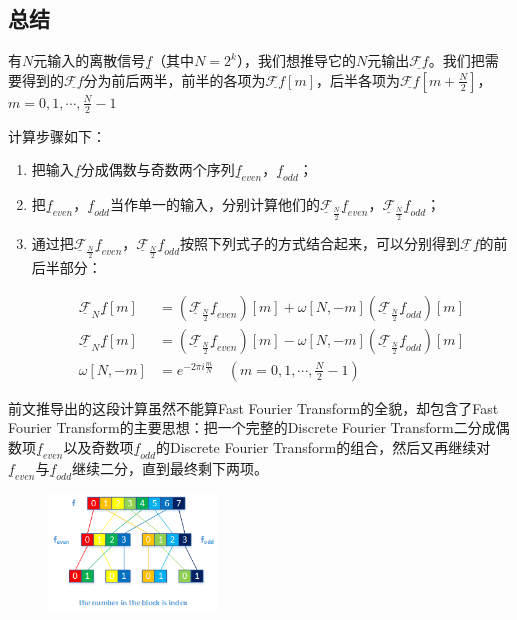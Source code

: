 \subsection{总结}
有$N$元输入的离散信号$\underline{f}$（其中$N=2^k$），我们想推导它的$N$元输出$\underline{\mathcal{F}f}$。我们把需要得到的$\underline{\mathcal{F}f}$分为前后两半，前半的各项为$\underline{\mathcal{F}f}[m]$，后半各项为$\underline{\mathcal{F}f}[m+\frac{N}{2}]$，$m=0,1,\cdots,\frac{N}{2}-1$

计算步骤如下：
\begin{enumerate}
	\item 把输入$\underline{f}$分成偶数与奇数两个序列$\underline{f}_{even}$，$\underline{f}_{odd}$；
	\item 把$\underline{f}_{even}$，$\underline{f}_{odd}$当作单一的输入，分别计算他们的$\underline{\mathcal{F}}_{\frac{N}{2}}\underline{f}_{even}$，$\underline{\mathcal{F}}_{\frac{N}{2}}\underline{f}_{odd}$；
	\item 通过把$\underline{\mathcal{F}}_{\frac{N}{2}}\underline{f}_{even}$，$\underline{\mathcal{F}}_{\frac{N}{2}}\underline{f}_{odd}$按照下列式子的方式结合起来，可以分别得到$\underline{\mathcal{F}}\underline{f}$的前后半部分：

	      \begin{align*}
		      \underline{\mathcal{F}}_N\underline{f}[m] & = \left( \underline{\mathcal{F}}_{\frac{N}{2}}\underline{f}_{even} \right)[m]+\omega[N,-m]\left( \underline{\mathcal{F}}_{\frac{N}{2}}\underline{f}_{odd} \right)[m] \\
		      \underline{\mathcal{F}}_N\underline{f}[m] & = \left( \underline{\mathcal{F}}_{\frac{N}{2}}\underline{f}_{even} \right)[m]-\omega[N,-m]\left( \underline{\mathcal{F}}_{\frac{N}{2}}\underline{f}_{odd} \right)[m] \\
		      \omega[N,-m]                              & = e^{-2\pi i\frac{m}{N}}\quad (m=0,1,\cdots,\frac{N}{2}-1)
	      \end{align*}
\end{enumerate}


前文推导出的这段计算虽然不能算Fast Fourier Transform的全貌，却包含了Fast Fourier Transform的主要思想：把一个完整的Discrete Fourier Transform二分成偶数项$\underline{f}_{even}$以及奇数项$\underline{f}_{odd}$的Discrete Fourier Transform的组合，然后又再继续对$\underline{f}_{even}$与$\underline{f}_{odd}$继续二分，直到最终剩下两项。
\begin{figure}[H]
	\centering
	\includegraphics[width=0.4\textwidth]{assets/FFT.png}
\end{figure}